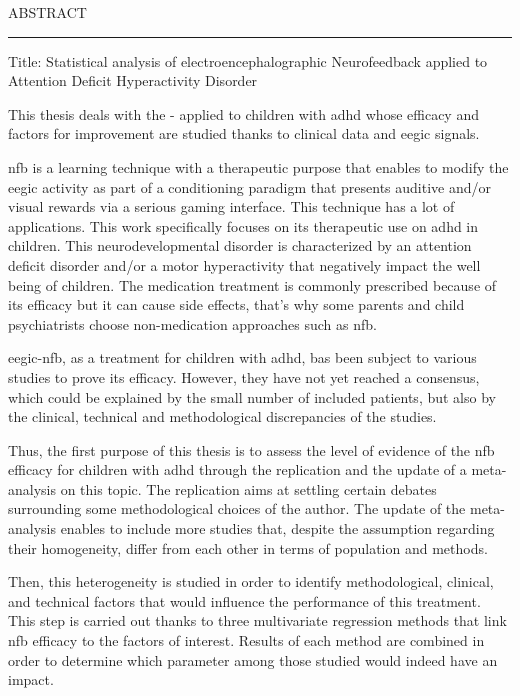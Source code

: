 

\begin{center}
\MakeUppercase{\LARGE{A}\Large{bstract}} \\
\noindent\rule{16cm}{0.4pt}
\end{center}

Title: Statistical analysis of electroencephalographic Neurofeedback applied to Attention Deficit Hyperactivity Disorder

This thesis deals with the - applied to children with \gls{adhd} whose efficacy and factors for 
improvement are studied thanks to clinical data and \gls{eegic} signals.

\gls{nfb} is a learning technique with a therapeutic purpose that enables to modify the \gls{eegic} activity 
as part of a conditioning paradigm that presents auditive and/or visual rewards via a serious gaming interface.
This technique has a lot of applications. This work specifically focuses on its therapeutic use on \gls{adhd} in children.
This neurodevelopmental disorder is characterized by an attention deficit disorder and/or a motor hyperactivity that
negatively impact the well being of children. The medication treatment is commonly prescribed because of its efficacy but
it can cause side effects, that's why some parents and child psychiatrists choose non-medication approaches such as \gls{nfb}. 

\gls{eegic}-\gls{nfb}, as a treatment for children with \gls{adhd}, bas been subject to various studies to prove its efficacy. 
However, they have not yet reached a consensus, which could be explained by the small number of included patients, but also by
the clinical, technical and methodological discrepancies of the studies.  

Thus, the first purpose of this thesis is to assess the level of evidence of the \gls{nfb} efficacy for children with \gls{adhd}
through the replication and the update of a meta-analysis on this topic. 
The replication aims at settling certain debates surrounding some methodological choices of the author. 
The update of the meta-analysis enables to include more studies that, despite the assumption regarding their homogeneity, 
differ from each other in terms of population and methods.

Then, this heterogeneity is studied in order to identify methodological, clinical, and technical factors that would influence
the performance of this treatment. This step is carried out thanks to three multivariate regression methods that link \gls{nfb} 
efficacy to the factors of interest. Results of each method are combined in order to determine which parameter among those
studied would indeed have an impact. 


